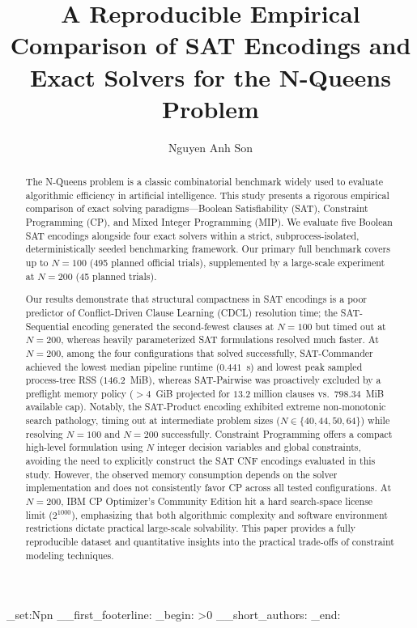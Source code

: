 \documentclass[a4paper,fleqn]{cas-sc}
\begin{document}
\let\printorcid\relax
{}

\ExplSyntaxOn
\cs_set:Npn \__first_footerline:
{
  \group_begin:
  \small
  \sffamily
  \ifnum\theblind>0\relax
  \else 
    \__short_authors:
  \fi
  \group_end:
}
\ExplSyntaxOff


\let\WriteBookmarks\relax
\def\floatpagepagefraction{1}
\def\textpagefraction{.001}


\title [mode = title]{A Reproducible Empirical Comparison of SAT Encodings and Exact Solvers for the N-Queens Problem}                      

\author[]{Nguyen Anh Son}

\begin{abstract}
The N-Queens problem is a classic combinatorial benchmark widely used to evaluate algorithmic efficiency in artificial intelligence. This study presents a rigorous empirical comparison of exact solving paradigms---Boolean Satisfiability (SAT), Constraint Programming (CP), and Mixed Integer Programming (MIP). We evaluate five Boolean SAT encodings alongside four exact solvers within a strict, subprocess-isolated, deterministically seeded benchmarking framework. Our primary full benchmark covers up to $N=100$ (495 planned official trials), supplemented by a large-scale experiment at $N=200$ (45 planned trials). 

Our results demonstrate that structural compactness in SAT encodings is a poor predictor of Conflict-Driven Clause Learning (CDCL) resolution time; the SAT-Sequential encoding generated the second-fewest clauses at $N=100$ but timed out at $N=200$, whereas heavily parameterized SAT formulations resolved much faster. At $N=200$, among the four configurations that solved successfully, SAT-Commander achieved the lowest median pipeline runtime ($0.441$~s) and lowest peak sampled process-tree RSS ($146.2$~MiB), whereas SAT-Pairwise was proactively excluded by a preflight memory policy ($>4$~GiB projected for $13.2$ million clauses vs.\ $798.34$~MiB available cap). Notably, the SAT-Product encoding exhibited extreme non-monotonic search pathology, timing out at intermediate problem sizes ($N \in \{40, 44, 50, 64\}$) while resolving $N=100$ and $N=200$ successfully. Constraint Programming offers a compact high-level formulation using $N$ integer decision variables and global constraints, avoiding the need to explicitly construct the SAT CNF encodings evaluated in this study. However, the observed memory consumption depends on the solver implementation and does not consistently favor CP across all tested configurations. At $N=200$, IBM CP Optimizer's Community Edition hit a hard search-space license limit ($2^{1000}$), emphasizing that both algorithmic complexity and software environment restrictions dictate practical large-scale solvability. This paper provides a fully reproducible dataset and quantitative insights into the practical trade-offs of constraint modeling techniques.
\end{abstract}
\end{document}
